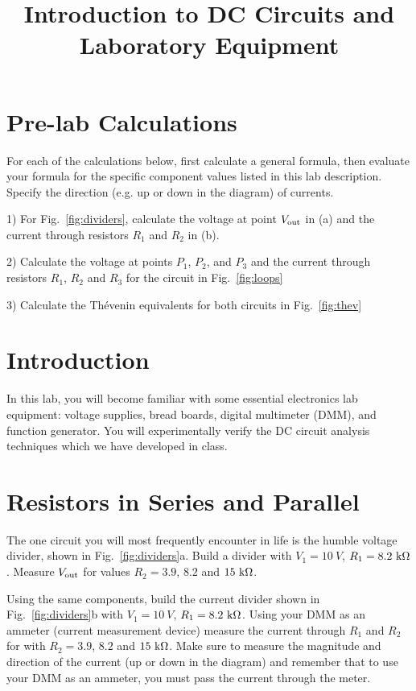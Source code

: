 \documentclass[12pt]{article}
\begin{document}
\title{Introduction to DC Circuits and Laboratory Equipment}

\maketitle

\section{Pre-lab Calculations}

For each of the calculations below, first calculate a general formula, then evaluate your formula for the specific component values listed in this lab description.  Specify the direction (e.g. up or down in the diagram) of currents.

1) For Fig.~\ref{fig:dividers}, calculate the voltage at point $V_{\rm out}$ in (a) and the current through resistors $R_1$ and $R_2$ in (b).

2) Calculate the voltage at points $P_1$, $P_2$, and $P_3$ and the current through resistors $R_1$, $R_2$ and $R_3$ for the circuit in Fig.~\ref{fig:loops}

3) Calculate the Th\'{e}venin equivalents for both circuits in Fig.~\ref{fig:thev}

\section{Introduction}

In this lab, you will become familiar with some essential electronics lab equipment:  voltage supplies, bread boards, digital multimeter (DMM), and function generator.  You will experimentally verify the DC circuit analysis techniques which we have developed in class.

\section{Resistors in Series and Parallel}

The one circuit you will most frequently encounter in life is the humble voltage divider, shown in Fig.~\ref{fig:dividers}a.  Build a divider with $V_1=10~V$, $R_1=8.2~\rm{k\Omega}$.  Measure $V_{\rm out}$ for values $R_2=3.9$, $8.2$ and $15~\rm{k\Omega}$.

Using the same components, build the current divider shown in Fig.~\ref{fig:dividers}b with $V_1=10~V$, $R_1=8.2~\rm{k\Omega}$.  Using your DMM as an ammeter (current measurement device) measure the current through $R_1$ and $R_2$ for with $R_2=3.9$, $8.2$ and $15~\rm{k\Omega}$.  Make sure to measure the magnitude and direction of the current (up or down in the diagram) and remember that to use your DMM as an ammeter, you must pass the current through the meter.
\end{document}
